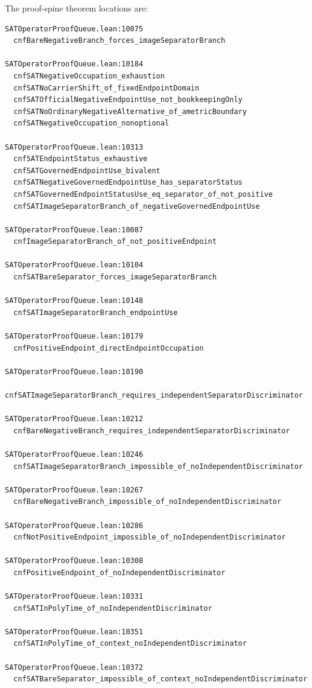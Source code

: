\documentclass[11pt]{article}
\theoremstyle{definition}
\theoremstyle{remark}
\begin{document}
The proof-spine theorem locations are:
\begin{lstlisting}[basicstyle=\ttfamily\scriptsize]
SATOperatorProofQueue.lean:10075
  cnfBareNegativeBranch_forces_imageSeparatorBranch

SATOperatorProofQueue.lean:10184
  cnfSATNegativeOccupation_exhaustion
  cnfSATNoCarrierShift_of_fixedEndpointDomain
  cnfSATOfficialNegativeEndpointUse_not_bookkeepingOnly
  cnfSATNoOrdinaryNegativeAlternative_of_ametricBoundary
  cnfSATNegativeOccupation_nonoptional

SATOperatorProofQueue.lean:10313
  cnfSATEndpointStatus_exhaustive
  cnfSATGovernedEndpointUse_bivalent
  cnfSATNegativeGovernedEndpointUse_has_separatorStatus
  cnfSATGovernedEndpointStatusUse_eq_separator_of_not_positive
  cnfSATImageSeparatorBranch_of_negativeGovernedEndpointUse

SATOperatorProofQueue.lean:10087
  cnfImageSeparatorBranch_of_not_positiveEndpoint

SATOperatorProofQueue.lean:10104
  cnfSATBareSeparator_forces_imageSeparatorBranch

SATOperatorProofQueue.lean:10148
  cnfSATImageSeparatorBranch_endpointUse

SATOperatorProofQueue.lean:10179
  cnfPositiveEndpoint_directEndpointOccupation

SATOperatorProofQueue.lean:10190
  cnfSATImageSeparatorBranch_requires_independentSeparatorDiscriminator

SATOperatorProofQueue.lean:10212
  cnfBareNegativeBranch_requires_independentSeparatorDiscriminator

SATOperatorProofQueue.lean:10246
  cnfSATImageSeparatorBranch_impossible_of_noIndependentDiscriminator

SATOperatorProofQueue.lean:10267
  cnfBareNegativeBranch_impossible_of_noIndependentDiscriminator

SATOperatorProofQueue.lean:10286
  cnfNotPositiveEndpoint_impossible_of_noIndependentDiscriminator

SATOperatorProofQueue.lean:10308
  cnfPositiveEndpoint_of_noIndependentDiscriminator

SATOperatorProofQueue.lean:10331
  cnfSATInPolyTime_of_noIndependentDiscriminator

SATOperatorProofQueue.lean:10351
  cnfSATInPolyTime_of_context_noIndependentDiscriminator

SATOperatorProofQueue.lean:10372
  cnfSATBareSeparator_impossible_of_context_noIndependentDiscriminator
\end{lstlisting}
\end{document}
